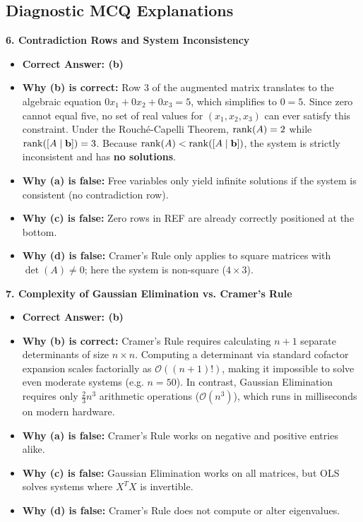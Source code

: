 \begin{enumerate}
\begin{equation*}
    \end{equation*}
\end{enumerate}

\subsection*{Diagnostic MCQ Explanations}

\textbf{6. Contradiction Rows and System Inconsistency}
\begin{itemize}
    \item \textbf{Correct Answer: (b)}
    \item \textbf{Why (b) is correct:} Row 3 of the augmented matrix translates to the algebraic equation $0x_1 + 0x_2 + 0x_3 = 5$, which simplifies to $0 = 5$. Since zero cannot equal five, no set of real values for $(x_1, x_2, x_3)$ can ever satisfy this constraint. Under the Rouché-Capelli Theorem, $\operatorname{rank}(A) = 2$ while $\operatorname{rank}([A \mid \mathbf{b}]) = 3$. Because $\operatorname{rank}(A) < \operatorname{rank}([A \mid \mathbf{b}])$, the system is strictly inconsistent and has \textbf{no solutions}.
    \item \textbf{Why (a) is false:} Free variables only yield infinite solutions if the system is consistent (no contradiction row).
    \item \textbf{Why (c) is false:} Zero rows in REF are already correctly positioned at the bottom.
    \item \textbf{Why (d) is false:} Cramer's Rule only applies to square matrices with $\det(A) \neq 0$; here the system is non-square ($4 \times 3$).
\end{itemize}

\textbf{7. Complexity of Gaussian Elimination vs. Cramer's Rule}
\begin{itemize}
    \item \textbf{Correct Answer: (b)}
    \item \textbf{Why (b) is correct:} Cramer's Rule requires calculating $n + 1$ separate determinants of size $n \times n$. Computing a determinant via standard cofactor expansion scales factorially as $\mathcal{O}((n+1)!)$, making it impossible to solve even moderate systems (e.g. $n = 50$). In contrast, Gaussian Elimination requires only $\frac{2}{3}n^3$ arithmetic operations ($\mathcal{O}(n^3)$), which runs in milliseconds on modern hardware.
    \item \textbf{Why (a) is false:} Cramer's Rule works on negative and positive entries alike.
    \item \textbf{Why (c) is false:} Gaussian Elimination works on all matrices, but OLS solves systems where $X^T X$ is invertible.
    \item \textbf{Why (d) is false:} Cramer's Rule does not compute or alter eigenvalues.
\end{itemize}

